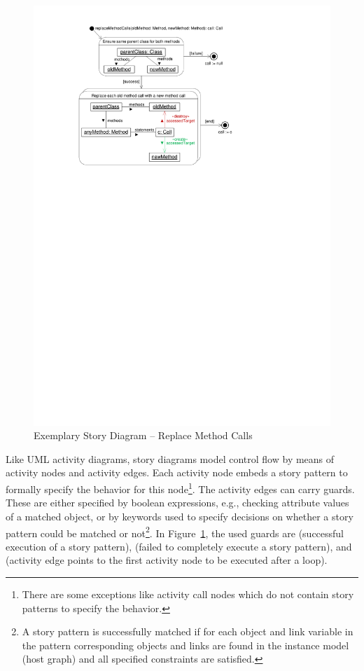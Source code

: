 \begin{figure}[htb]
  \centering
  \includegraphics[scale=1.0]{figures/SimpleStoryDiagramExample}
  \caption{Exemplary Story Diagram -- Replace Method Calls}
  \label{fig:simpleStoryDiagram}
\end{figure}

Like UML activity diagrams, story diagrams model control flow by means of activity nodes and activity edges.
Each activity node embeds a story pattern to formally specify the behavior for this node\footnote{There are
some exceptions like activity call nodes which do not contain story patterns to specify the behavior.}.
The activity edges can carry guards.
These are either specified by boolean expressions, e.g., checking attribute values of a matched object,
or by keywords used to specify decisions on whether a story pattern could be
matched or not\footnote{A story pattern is successfully matched if for each object and link variable in the pattern corresponding objects and links are found in the instance model (host graph) and all specified constraints are satisfied.}.
In Figure~\ref{fig:simpleStoryDiagram}, the used guards are  (successful execution of a story pattern),
 (failed to completely execute a story pattern),
and  (activity edge points to the first activity node to be executed after a loop).

